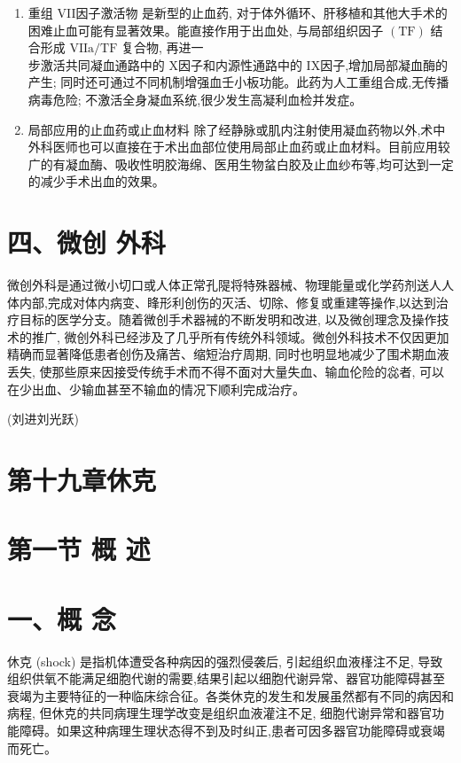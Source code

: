 \documentclass[10pt]{article}
\begin{document}
\begin{enumerate}
  \item 重组 VII因子激活物 是新型的止血药, 对于体外循环、肝移植和其他大手术的困难止血可能有显著效果。能直接作用于出血处, 与局部组织因子 $(\mathrm{TF})$ 结合形成 $\mathrm{VII} \mathrm{a} / \mathrm{TF}$ 复合物, 再进一\\
步激活共同凝血通路中的 X因子和内源性通路中的 IX因子,增加局部凝血酶的产生; 同时还可通过不同机制增强血壬小板功能。此药为人工重组合成,无传播病毒危险; 不激活全身凝血系统,很少发生高凝利血检并发症。

  \item 局部应用的止血药或止血材料 除了经静脉或肌内注射使用凝血药物以外,术中外科医师也可以直接在于术出血部位使用局部止血药或止血材料。目前应用较广的有凝血酶、吸收性明胶海绵、医用生物蚠白胶及止血纱布等,均可达到一定的减少手术出血的效果。

\end{enumerate}

\section*{四、微创 外科}
微创外科是通过微小切口或人体正常孔隄将特殊器械、物理能量或化学药剂送人人体内部,完成对体内病变、䀱形利创伤的灭活、切除、修复或重建等操作,以达到治疗目标的医学分支。随着微创手术器裓的不断发明和改进, 以及微创理念及操作技术的推广, 微创外科已经涉及了几乎所有传统外科领域。微创外科技术不仅因更加精确而显著降低患者创伤及痛苦、缩短治疗周期, 同时也明显地减少了围术期血液丢失, 使那些原来因接受传统手术而不得不面对大量失血、输血伦险的惢者, 可以在少出血、少输血甚至不输血的情况下顺利完成治疗。

(刘进刘光跃)

\section*{第十九章休克}
\section*{第一节 概 述}
\section*{一、概 念}
休克 (shock) 是指机体遭受各种病因的强烈侵袭后, 引起组织血液樥注不足, 导致组织供氧不能满足细胞代谢的需要,结果引起以细胞代谢异常、器官功能障碍甚至衰竭为主要特征的一种临床综合征。各类休克的发生和发展虽然都有不同的病因和病程, 但休克的共同病理生理学改变是组织血液灌注不足, 细胞代谢异常和器官功能障碍。如果这种病理生理状态得不到及时纠正,患者可因多器官功能障碍或衰竭而死亡。
\end{document}
